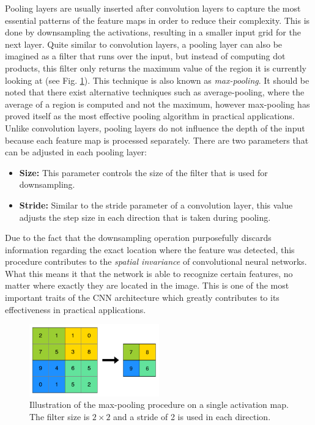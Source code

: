 Pooling layers are usually inserted after convolution layers to capture
the most essential patterns of the feature maps in order to reduce
their complexity. This is done by downsampling the activations,
resulting in a smaller input grid for the next layer. Quite similar to
convolution layers, a pooling layer can also be imagined as a filter
that runs over the input, but instead of computing dot products, this
filter only returns the maximum value of the region it is currently
looking at (see Fig. \ref{fig:pooling}). This technique is also known
as \textit{max-pooling}. It should be noted that there exist
alternative techniques such as average-pooling, where the average of a
region is computed and not the maximum, however max-pooling has proved
itself as the most effective pooling algorithm in practical
applications. Unlike convolution
layers, pooling layers do not influence the depth of the input
because each feature map is processed separately. There are two
parameters that can be adjusted in each pooling layer:
\begin{itemize}
  \item \textbf{Size:} This parameter controls the size of the filter
    that is used for downsampling.
  \item \textbf{Stride:} Similar to the stride parameter of a
    convolution layer, this value adjusts the step size in each
    direction that is taken during pooling.
\end{itemize}
Due to the fact that the downsampling operation purposefully discards
information regarding the exact location where the feature was
detected, this procedure contributes to the \textit{spatial
  invariance} of convolutional neural networks. What this means it that
the network is able to recognize certain features, no matter where
exactly they are located in the image. This is one of the most
important traits of the CNN architecture which greatly contributes to
its effectiveness in practical applications.

\begin{figure}[h]
  \centering
  \includegraphics[width=0.5\textwidth]{../figures/pooling}
  \caption{Illustration of the max-pooling procedure on a single
    activation map. The filter size is \(2 \times 2\) and a stride of
    2 is used in each direction.}
  \label{fig:pooling}
\end{figure}

